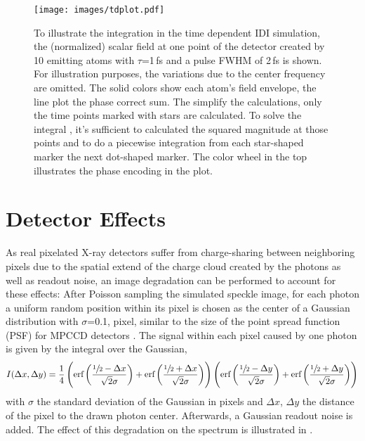\begin{figure}
	\centering
	\texttt{[image: images/tdplot.pdf]}
	\caption[Integration in time dependent IDI simulation]{To illustrate the integration in the time dependent IDI simulation, the (normalized) scalar field at one point of the detector created by 10 emitting atoms with $\tau$=1\,fs and a pulse FWHM of 2\,fs is shown. For illustration purposes, the variations due to the center frequency are omitted. The solid colors show each atom's field envelope, the line plot the phase correct sum. The simplify the calculations, only the time points marked with stars are calculated. To solve the integral , it's sufficient to calculated the squared magnitude at those points and to do a piecewise integration from each star-shaped marker the next dot-shaped marker. The color wheel in the top illustrates the phase encoding in the plot.}
	\label{fig:tdplot}
\end{figure}

\section{Detector Effects}
\label{sec:chargesharing}
As real pixelated X-ray detectors suffer from charge-sharing between neighboring pixels due to the spatial extend of the charge cloud created by the photons as well as readout noise, an image degradation can be performed to account for these effects: After Poisson sampling the simulated speckle image, for each photon a uniform random position within its pixel is chosen as the center of a Gaussian distribution with $\sigma$=0.1, pixel, similar to the size of the point spread function (PSF) for MPCCD detectors \cite{mpccd}.
The signal within each pixel caused by one photon is given by the integral over the Gaussian,
\begin{equation*}
	I(\Delta x,\Delta y)=\frac{1}{4} \left(\text{erf}\left(\frac{\sfrac{1}{2}-\Delta x}{\sqrt{2}
		\sigma}\right)+\text{erf}\left(\frac{\sfrac{1}{2}+\Delta x}{\sqrt{2} \sigma}\right)\right) \left(\text{erf}\left(\frac{\sfrac{1}{2}-\Delta y}{\sqrt{2}
		\sigma}\right)+\text{erf}\left(\frac{\sfrac{1}{2}+\Delta y}{\sqrt{2} \sigma}\right)\right)
\end{equation*}
with $\sigma$ the standard deviation of the Gaussian in pixels and $\Delta x$, $\Delta y$ the distance of the pixel to the drawn photon center. Afterwards, a Gaussian readout noise is added. The effect of this degradation on the spectrum is illustrated in .

